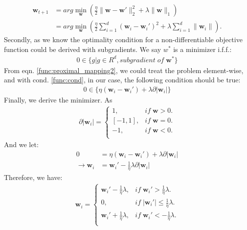 \documentclass[a4paper,12pt]{article}
\begin{document}
\begin{align}
   \label{func:proximal_mapping2}
   \nonumber \textbf{w}_{t+1} &= arg \min_{\textbf{w}} (\frac{\eta}{2}\| \textbf{w} - \textbf{w}' \|^2_2 + \lambda \|\textbf{w}\|_1) \\ 
                    &= arg \min_{\textbf{w}} (\frac{\eta}{2} \sum_{i=1}^{d} (\textbf{w}_i - \textbf{w}_i')^2  + \lambda \sum_{i=1}^{d} \|\textbf{w}_i\|).
\end{align}
Secondly, as we know the optimality condition for a non-differentiable objective function could be derived with subgradients.
We say $w^{*}$ is a minimizer i.f.f.:
\begin{align}
   \label{func:cond}
   0 \in \{ g | g \in R^d, subgradient \; of \;  \textbf{w}^*\}
\end{align}
From eqn. \ref{func:proximal_mapping2}, we could treat the problem element-wise, and with cond. \ref{func:cond}, 
in our case, the following condition should be true:
\begin{align}
   0 \in \{ \eta (\textbf{w}_i - \textbf{w}_i')+\lambda \partial |\textbf{w}_i|  \}
\end{align}
Finally, we derive the minimizer. As 
\begin{align}
   \partial |\textbf{w}_i|
   =\begin{cases}
      1, & if \; \textbf{w} > 0.\\
      [-1,1], & if \; \textbf{w} = 0.\\
      -1, & if \; \textbf{w} < 0.\\
    \end{cases}
\end{align}
And we let:
\begin{align}
   0&=\eta (\textbf{w}_i - \textbf{w}_i')+\lambda \partial |\textbf{w}_i| \\
   \rightarrow \textbf{w}_i &= \textbf{w}_i' - \frac{1}{\eta}\lambda \partial |\textbf{w}_i|
\end{align}
Therefore, we have:
\begin{align}
   \textbf{w}_i = 
   \begin{cases}
      \textbf{w}_i' - \frac{1}{\eta} \lambda, & if \; \textbf{w}_i' > \frac{1}{\eta}\lambda.\\
      0, & if \; |\textbf{w}_i'| \leq \frac{1}{\eta}\lambda.\\
      \textbf{w}_i' + \frac{1}{\eta} \lambda, & if \; \textbf{w}_i' < -\frac{1}{\eta}\lambda.\\
    \end{cases}
\end{align}
\end{document}
